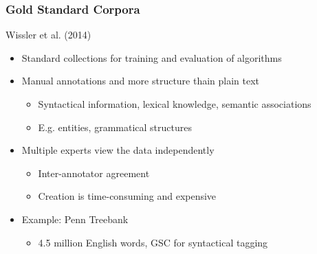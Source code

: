 \begin{frame}
    \frametitle{Gold Standard Corpora}
    \textcolor{iseblue}{Wissler et al. (2014)}
    \begin{itemize}
        \item Standard collections for training and evaluation of algorithms
        \item Manual annotations and more structure thain plain text
    \begin{itemize}
        \item Syntactical information, lexical knowledge, semantic associations
        \item E.g. entities, grammatical structures
    \end{itemize}
    \item Multiple experts view the data independently
    \begin{itemize}
        \item Inter-annotator agreement
        \item Creation is time-consuming and expensive
    \end{itemize}
    \item Example: Penn Treebank
    \begin{itemize}
        \item 4.5 million English words, GSC for syntactical tagging
    \end{itemize}
    \end{itemize}
\end{frame}

